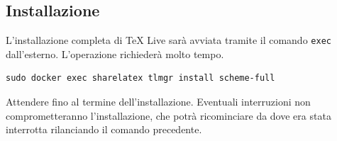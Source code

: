 \subsection{Installazione}
L'installazione completa di TeX Live sarà avviata tramite il comando \verb|exec| dall'esterno. L'operazione richiederà molto tempo.
\begin{lstlisting}
sudo docker exec sharelatex tlmgr install scheme-full
\end{lstlisting}
Attendere fino al termine dell'installazione. Eventuali interruzioni non comprometteranno l'installazione, che potrà ricominciare da dove era stata interrotta rilanciando il comando precedente.